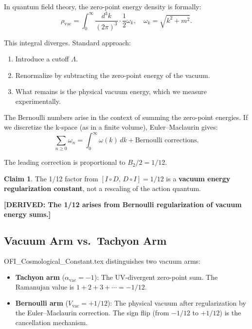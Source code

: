 \documentclass[12pt]{article}
\theoremstyle{definition}
\newtheorem{claim}[theorem]{Claim}
\newcommand{\rhovac}{\rho_{\mathrm{vac}}}
\newcommand{\DERIVED}[1]{\textcolor{derivedcolor}{\textbf{[DERIVED: #1]}}}
\begin{document}
In quantum field theory, the zero-point energy density is formally:
\begin{equation}
  \rhovac = \int_0^\infty \frac{d^3k}{(2\pi)^3} \cdot \frac{1}{2}\omega_k,
  \quad \omega_k = \sqrt{k^2 + m^2}.
\end{equation}

This integral diverges. Standard approach:
\begin{enumerate}
  \item Introduce a cutoff $\Lambda$.
  \item Renormalize by subtracting the zero-point energy of the vacuum.
  \item What remains is the physical vacuum energy, which we measure experimentally.
\end{enumerate}

The Bernoulli numbers arise in the context of summing the zero-point energies. If we
discretize the k-space (as in a finite volume), Euler--Maclaurin gives:
\begin{equation}
  \sum_{n \geq 0} \omega_n = \int_0^\infty \omega(k)\,dk + \text{Bernoulli corrections}.
\end{equation}

The leading correction is proportional to $B_2/2 = 1/12$.

\begin{claim}
The 1/12 factor from $[I\circ D,\, D\circ I] = 1/12$ is a \textbf{vacuum energy
regularization constant}, not a rescaling of the action quantum.
\end{claim}

\DERIVED{The 1/12 arises from Bernoulli regularization of vacuum energy sums.}

\subsection{Vacuum Arm vs.\ Tachyon Arm}

OFI_Cosmological_Constant.tex distinguishes two vacuum arms:
\begin{itemize}
  \item \textbf{Tachyon arm} ($\alpha_{\mathrm{vac}} = -1$): The UV-divergent zero-point sum.
    The Ramanujan value is $1 + 2 + 3 + \cdots = -1/12$.

  \item \textbf{Bernoulli arm} ($V_{\mathrm{vac}} = +1/12$): The physical vacuum after
    regularization by the Euler--Maclaurin correction. The sign flip (from $-1/12$ to
    $+1/12$) is the cancellation mechanism.
\end{itemize}
\end{document}
